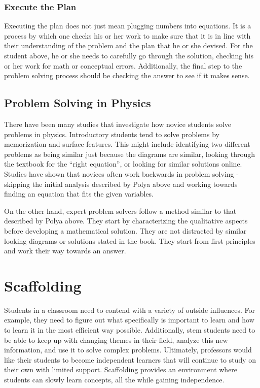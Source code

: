 \subsubsection{Execute the Plan}

Executing the plan does not just mean plugging numbers into equations. It is a process by which one checks his or her work to make sure that it is in line with their understanding of the problem and the plan that he or she devised. For the student above, he or she needs to carefully go through the solution, checking his or her work for math or conceptual errors. Additionally, the final step to the problem solving process should be checking the answer to see if it makes sense.

\subsection{Problem Solving in Physics}

There have been many studies that investigate how novice students solve problems in physics. Introductory students tend to solve problems by memorization and surface features. This might include identifying two different problems as being similar just because the diagrams are similar, looking through the textbook for the ``right equation'', or looking for similar solutions online\cite{maloney1994, walsh2007}. Studies have shown that novices often work backwards in problem solving - skipping the initial analysis described by Polya above and working towards finding an equation that fits the given variables.

On the other hand, expert problem solvers follow a method similar to that described by Polya above. They start by characterizing the qualitative aspects before developing a mathematical solution. They are not distracted by similar looking diagrams or solutions stated in the book. They start from first principles and work their way towards an answer\cite{larkin1980}.

\section{Scaffolding}

Students in a classroom need to contend with a variety of outside influences. For example, they need to figure out what specifically is important to learn and how to learn it in the most efficient way possible. Additionally, \gls{stem} students need to be able to keep up with changing themes in their field, analyze this new information, and use it to solve complex problems. Ultimately, professors would like their students to become independent learners that will continue to study on their own with limited support. Scaffolding provides an environment where students can slowly learn concepts, all the while gaining independence\cite{larkin2002}.

